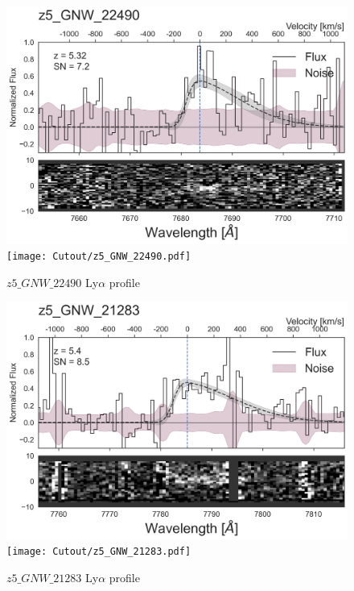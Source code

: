 \documentclass[12pt,english]{article}
\begin{document}
\begin{figure}
\begin{center}\includegraphics[width=12cm, trim=0.1cm 0cm 0cm -1cm]{LyaProfiles/z5_GNW_22490.png}
\texttt{[image: Cutout/z5\_GNW\_22490.pdf]}
\caption{$z5\_GNW\_22490$ Ly$\alpha$ profile}
\end{center}
\end{figure}
\clearpage
\begin{figure}
\begin{center}\includegraphics[width=12cm, trim=0.1cm 0cm 0cm -1cm]{LyaProfiles/z5_GNW_21283.png}
\texttt{[image: Cutout/z5\_GNW\_21283.pdf]}
\caption{$z5\_GNW\_21283$ Ly$\alpha$ profile}
\end{center}
\end{figure}
\clearpage
\end{document}
